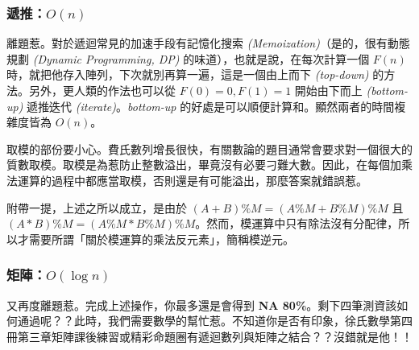\documentclass[a4paper,10pt]{article}
\begin{document}
\subsubsection{遞推：$O(n)$}

離題惹。對於遞迴常見的加速手段有記憶化搜索 \textit{(Memoization)}（是的，很有動態規劃 \textit{(Dynamic Programming, DP)} 的味道），也就是說，在每次計算一個 $F(n)$ 時，就把他存入陣列，下次就別再算一遍，這是一個由上而下 \textit{(top-down)} 的方法。另外，更人類的作法也可以從 $F(0) = 0, F(1) = 1$ 開始由下而上 \textit{(bottom-up)} 遞推∕迭代 \textit{(iterate)}。\textit{bottom-up} 的好處是可以順便計算和。顯然兩者的時間複雜度皆為 $O(n)$。

取模的部份要小心。費氏數列增長很快，有關數論的題目通常會要求對一個很大的質數取模。取模是為惹防止整數溢出，畢竟沒有必要刁難大數。因此，在每個加乘法運算的過程中都應當取模，否則還是有可能溢出，那麼答案就錯誤惹。

附帶一提，上述之所以成立，是由於 $(A + B) \% M = (A \% M + B \% M) \% M$ 且 $(A * B) \% M = (A \% M * B \% M) \% M$。然而，模運算中只有除法沒有分配律，所以才需要所謂「關於模運算的乘法反元素」，簡稱模逆元。

\subsubsection{矩陣：$O(\log n)$}

又再度離題惹。完成上述操作，你最多還是會得到 \textbf{NA 80\%}。剩下四筆測資該如何通過呢？？此時，我們需要數學的幫忙惹。不知道你是否有印象，徐氏數學第四冊第三章矩陣課後練習或精彩命題圈有遞迴數列與矩陣之結合？？沒錯就是他！！
\end{document}
